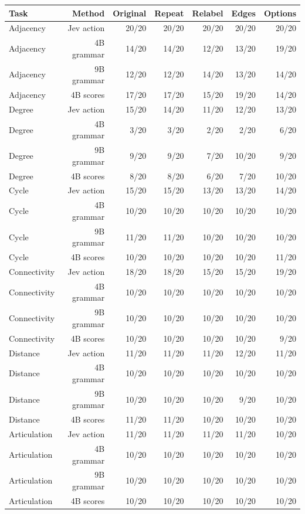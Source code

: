 \begin{tabular}{lrrrrrr}
\toprule
Task & Method & Original & Repeat & Relabel & Edges & Options \\
\midrule
Adjacency & Jev action & 20/20 & 20/20 & 20/20 & 20/20 & 20/20 \\
Adjacency & 4B grammar & 14/20 & 14/20 & 12/20 & 13/20 & 19/20 \\
Adjacency & 9B grammar & 12/20 & 12/20 & 14/20 & 13/20 & 14/20 \\
Adjacency & 4B scores & 17/20 & 17/20 & 15/20 & 19/20 & 14/20 \\
Degree & Jev action & 15/20 & 14/20 & 11/20 & 12/20 & 13/20 \\
Degree & 4B grammar & 3/20 & 3/20 & 2/20 & 2/20 & 6/20 \\
Degree & 9B grammar & 9/20 & 9/20 & 7/20 & 10/20 & 9/20 \\
Degree & 4B scores & 8/20 & 8/20 & 6/20 & 7/20 & 10/20 \\
Cycle & Jev action & 15/20 & 15/20 & 13/20 & 13/20 & 14/20 \\
Cycle & 4B grammar & 10/20 & 10/20 & 10/20 & 10/20 & 10/20 \\
Cycle & 9B grammar & 11/20 & 11/20 & 10/20 & 10/20 & 10/20 \\
Cycle & 4B scores & 10/20 & 10/20 & 10/20 & 10/20 & 11/20 \\
Connectivity & Jev action & 18/20 & 18/20 & 15/20 & 15/20 & 19/20 \\
Connectivity & 4B grammar & 10/20 & 10/20 & 10/20 & 10/20 & 10/20 \\
Connectivity & 9B grammar & 10/20 & 10/20 & 10/20 & 10/20 & 10/20 \\
Connectivity & 4B scores & 10/20 & 10/20 & 10/20 & 10/20 & 9/20 \\
Distance & Jev action & 11/20 & 11/20 & 11/20 & 12/20 & 11/20 \\
Distance & 4B grammar & 10/20 & 10/20 & 10/20 & 10/20 & 10/20 \\
Distance & 9B grammar & 10/20 & 10/20 & 10/20 & 9/20 & 10/20 \\
Distance & 4B scores & 11/20 & 11/20 & 10/20 & 10/20 & 10/20 \\
Articulation & Jev action & 11/20 & 11/20 & 11/20 & 11/20 & 10/20 \\
Articulation & 4B grammar & 10/20 & 10/20 & 10/20 & 10/20 & 10/20 \\
Articulation & 9B grammar & 10/20 & 10/20 & 10/20 & 10/20 & 10/20 \\
Articulation & 4B scores & 10/20 & 10/20 & 10/20 & 10/20 & 10/20 \\
\bottomrule
\end{tabular}
